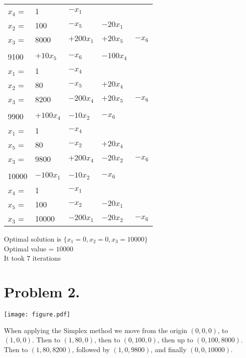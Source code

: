 \documentclass[12pt]{report}
\begin{document}
\begin{tabular}{ l l l l l }
  $x_4$ = & 1 &  $-x_1$ \\ 
  $x_2$ = & 100 & $- x_5$ & $-20x_1$ \\ 
  $x_3$ = & 8000  & $+200x_1$ & $+20x_5$ & $-x_6$  \\ 

  \\
  9100 & $+10x_5$ & $-x_6$ & $-100x_4$  \\  \hline

  $x_1$ = & 1 &  $-x_4$ \\ 
  $x_2$ = & 80 & $- x_5$ & $+20x_4$ \\ 
  $x_3$ = & 8200  & $-200x_4$ & $+20x_5$ & $-x_6$  \\ 

  \\
  9900 & $+100x_4$ & $-10x_2$ & $-x_6$  \\  \hline

  $x_1$ = & 1 &  $-x_4$ \\ 
  $x_5$ = & 80 & $- x_2$ & $+20x_4$ \\ 
  $x_3$ = & 9800  & $+200x_4$ & $-20x_2$ & $-x_6$  \\ 

  \\
  10000 & $-100x_1$ & $-10x_2$ & $-x_6$   \\  \hline

  $x_4$ = & 1 &  $-x_1$ \\ 
  $x_5$ = & 100 & $- x_2$ & $-20x_1$ \\ 
  $x_3$ = & 10000  & $-200x_1$ & $-20x_2$ & $-x_6$  \\ 

\end{tabular}


Optimal solution is $\{ x_1 = 0, x_2 = 0, x_3 = 10000 \}$\\
Optimal value = $10000$ \\
It took $7$ iterations


\section*{Problem 2.}

\texttt{[image: figure.pdf]}

When applying the Simplex method we move from the origin $(0,0,0)$, to $(1,0,0)$.
Then to $(1,80,0)$, then to $(0,100,0)$, then up to $(0,100,8000)$.
Then to $(1,80,8200)$, followed by $(1,0,9800)$, and finally $(0,0,10000)$. \\
\end{document}

